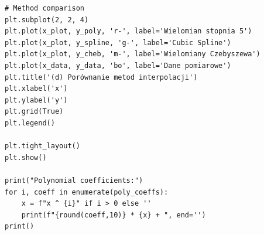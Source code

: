 \documentclass{article}
\begin{document}
\begin{verbatim}
# Method comparison 
plt.subplot(2, 2, 4)
plt.plot(x_plot, y_poly, 'r-', label='Wielomian stopnia 5')
plt.plot(x_plot, y_spline, 'g-', label='Cubic Spline')
plt.plot(x_plot, y_cheb, 'm-', label='Wielomiany Czebyszewa')
plt.plot(x_data, y_data, 'bo', label='Dane pomiarowe')
plt.title('(d) Porównanie metod interpolacji')
plt.xlabel('x')
plt.ylabel('y')
plt.grid(True)
plt.legend()

plt.tight_layout()
plt.show()

print("Polynomial coefficients:")
for i, coeff in enumerate(poly_coeffs):
    x = f"x ^ {i}" if i > 0 else ''
    print(f"{round(coeff,10)} * {x} + ", end='')
print()

\end{verbatim}

\bigskip



\end{document}
